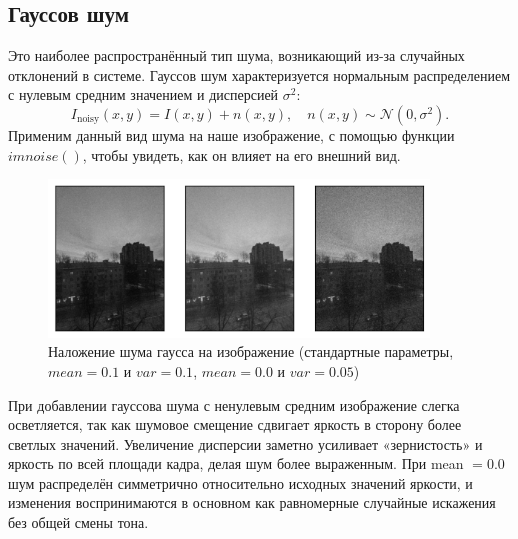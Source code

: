 \documentclass[a4paper,12pt]{article}
\begin{document}
\subsection{Гауссов шум}
Это наиболее распространённый тип шума, возникающий из-за случайных отклонений в системе. Гауссов шум характеризуется нормальным распределением с нулевым средним значением и дисперсией \(\sigma^2\):
\begin{equation*}
    I_{\text{noisy}}(x,y) = I(x,y) + n(x,y), \quad n(x,y) \sim \mathcal{N}(0,\sigma^2).
\end{equation*}
Применим данный вид шума на наше изображение, с помощью функции $imnoise()$, чтобы увидеть, как он влияет на его внешний вид.
\begin{figure}[H]
    \centering \includegraphics[width=0.9\textwidth]{results/gaussian_v.png}
    \caption{Наложение шума гаусса на изображение (стандартные параметры, $mean=0.1$ и $var=0.1$, $mean=0.0$ и $var=0.05$)}
\end{figure}
\noindent
При добавлении гауссова шума с ненулевым средним изображение слегка осветляется, так как шумовое смещение сдвигает яркость в сторону более светлых значений. Увеличение дисперсии заметно усиливает «зернистость» и яркость по всей площади кадра, делая шум более выраженным. При mean $=0.0$ шум распределён симметрично относительно исходных значений яркости, и изменения воспринимаются в основном как равномерные случайные искажения без общей смены тона.
\end{document}
